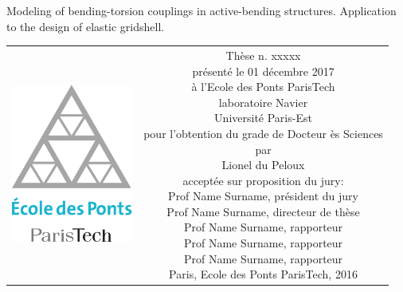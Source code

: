 \begin{titlepage}
\begin{center}
\sffamily


\null\vspace{2cm}
{\huge Modeling of bending-torsion couplings in active-bending structures. Application to the design of elastic gridshell.} \\[24pt] 
    
\vfill

\begin{tabular} {cc}
\parbox{0.3\textwidth}{\includegraphics[width=4cm]{head/logo_enpc}}
&
\parbox{0.7\textwidth}{%
	Thèse n. xxxxx\\
	présenté le 01 décembre 2017\\
	à l'Ecole des Ponts ParisTech\\
	laboratoire Navier\\
%
	Université Paris-Est\\[6pt]
	pour l'obtention du grade de Docteur ès Sciences\\
	par\\ [4pt]
	\null \hspace{3em} Lionel du Peloux\\[9pt]
%
\small
acceptée sur proposition du jury:\\[4pt]
%
    Prof Name Surname, président du jury\\
    Prof Name Surname, directeur de thèse\\
    Prof Name Surname, rapporteur\\
    Prof Name Surname, rapporteur\\
    Prof Name Surname, rapporteur\\[12pt]
%
Paris, Ecole des Ponts ParisTech, 2016}
\end{tabular}
\end{center}
\vspace{2cm}
\end{titlepage}



